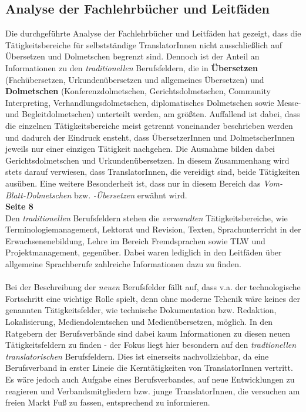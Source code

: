 \documentclass{article}
\begin{document}
	\subsection*{Analyse der Fachlehrbücher und Leitfäden}
	Die durchgeführte Analyse der Fachlehrbücher und Leitfäden hat gezeigt, dass die Tätigkeitsbereiche für selbstständige TranslatorInnen nicht ausschließlich auf Übersetzen und Dolmetschen begrenzt sind. Dennoch ist der Anteil an Informationen zu den \textit{traditionellen} Berufsfeldern, die in \textbf{Übersetzen} (Fachübersetzen, Urkundenübersetzen und allgemeines Übersetzen) und \textbf{Dolmetschen} (Konferenzdolmetschen, Gerichtsdolmetschen, Community Interpreting, Verhandlungsdolmetschen, diplomatisches Dolmetschen sowie Messe- und Begleitdolmetschen) unterteilt werden, am größten. Auffallend ist dabei, dass die einzelnen Tätigkeitsbereiche meist getrennt voneinander beschrieben werden und dadurch der Eindruck ensteht, dass ÜbersetzerInnen und DolmetscherInnen jeweils nur einer einzigen Tätigkeit nachgehen. Die Ausnahme bilden dabei Gerichtsdolmetschen und Urkundenübersetzen. In diesem Zusammenhang wird stets darauf verwiesen, dass TranslatorInnen, die vereidigt sind, beide Tätigkeiten ausüben. Eine weitere Besonderheit ist, dass nur in diesem Bereich das \textit{Vom-Blatt-Dolmetschen} bzw. \textit{-Übersetzen} erwähnt wird. \\
	\textbf{Seite 8} \\
	Den \textit{traditionellen} Berufsfeldern stehen die \textit{verwandten} Tätigkeitsbereiche, wie Terminologiemanagement, Lektorat und Revision, Texten, Sprachunterricht in der Erwachsenenebildung, Lehre im Bereich Fremdsprachen sowie TLW und Projektmanagement, gegenüber. Dabei waren lediglich in den Leitfäden über allgemeine Sprachberufe zahlreiche Informationen dazu zu finden. \\ \\
	Bei der Beschreibung der \textit{neuen} Berufsfelder fällt auf, dass v.a. der technologische Fortschritt eine wichtige Rolle spielt, denn ohne moderne Tehcnik wäre keines der genannten Tätigkeitsfelder, wie technische Dokumentation bzw. Redaktion, Lokalisierung, Mediendolemtschen und Medienübersetzen, möglich. In den Ratgebern der Berufsverbände sind dabei kaum Informationen zu diesen neuen Tätigkeitsfeldern zu finden - der Fokus liegt hier besondern auf den \textit{tradtionellen translatorischen} Berufsfeldern. Dies ist einerseits nachvollziehbar, da eine Berufsverband in erster Lineie die \glqq Kerntätigkeiten\grqq \: von TranslatorInnen vertritt. Es wäre jedoch auch Aufgabe eines Berufsverbandes, auf neue Entwicklungen zu reagieren und Verbandsmitgliedern bzw. junge TranslatorInnen, die versuchen am freien Markt Fuß zu fassen, entsprechend zu informieren.
\end{document}
